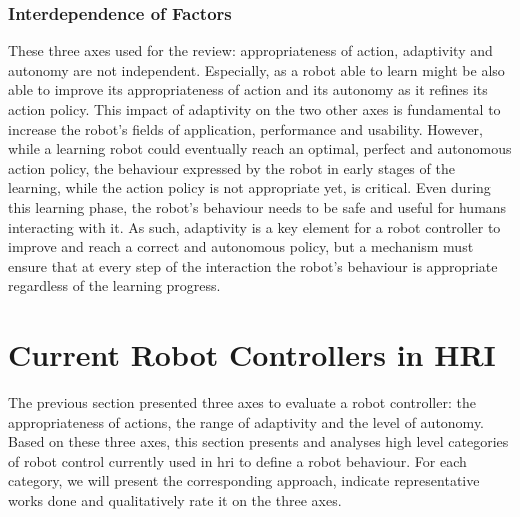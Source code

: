 
\subsubsection{Interdependence of Factors}

	These three axes used for the review: appropriateness of action, adaptivity and autonomy are not independent. Especially, as a robot able to learn might be also able to improve its appropriateness of action and its autonomy as it refines its action policy. This impact of adaptivity on the two other axes is fundamental to increase the robot's fields of application, performance and usability. However, while a learning robot could eventually reach an optimal, perfect and autonomous action policy, the behaviour expressed by the robot in early stages of the learning, while the action policy is not appropriate yet, is critical. Even during this learning phase, the robot's behaviour needs to be safe and useful for humans interacting with it. As such, adaptivity is a key element for a robot controller to improve and reach a correct and autonomous policy, but a mechanism must ensure that at every step of the interaction the robot's behaviour is appropriate regardless of the learning progress.

\section{Current Robot Controllers in HRI} \label{sec:back_behaviour}

    The previous section presented three axes to evaluate a robot controller: the appropriateness of actions, the range of adaptivity and the level of autonomy. Based on these three axes, this section presents and analyses high level categories of robot control currently used in \gls{hri} to define a robot behaviour. 
    For each category, we will present the corresponding approach, indicate representative works done and qualitatively rate it on the three axes.
	
